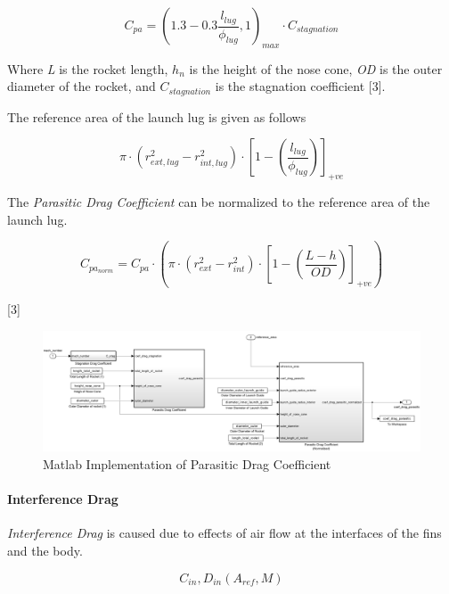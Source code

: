 \documentclass[]{article}
\let\oldparagraph\paragraph
\renewcommand{\paragraph}[1]{\oldparagraph{#1}\mbox{}}
\begin{document}
\begin{equation}
C_{pa} = \left( 1.3 - 0.3 \dfrac{l_{lug}}{\phi_{lug}} , 1 \right)_{max} \cdot C_{stagnation} 
\end{equation}

Where \emph{L} is the rocket length, \(h_n\) is the height of the nose
cone, \emph{OD} is the outer diameter of the rocket, and
\(C_{stagnation}\) is the stagnation coefficient {[}3{]}.

The reference area of the launch lug is given as follows

\begin{equation}
\label{eq_area_reference_launch_lug}
\pi \cdot (r_{ext,lug}^2 - r_{int,lug}^2) \cdot 
\left[ 1 - \left( \dfrac{l_{lug}}{\phi_{lug}} \right) \right]_{+ve} 
\end{equation}

The \emph{Parasitic Drag Coefficient} can be normalized to the reference
area of the launch lug.

\begin{equation}
\label{eq_coef_drag_parasitic_normalized}
C_{pa_{norm}} = 
C_{pa} \cdot 
\left( 
\pi \cdot (r_{ext}^2 - r_{int}^2) \cdot 
\left[ 1 - \left( \dfrac{L-h}{OD} \right)  \right]_{+ve} 
\right) 
\end{equation}

{[}3{]}

\begin{figure}[htbp]
\centering
\includegraphics{images/drag/coef_drag_parasitic.png}
\caption{Matlab Implementation of Parasitic Drag
Coefficient\label{img_coef_drag_parasitic_label}}
\end{figure}

\paragraph{Interference Drag}\label{interference-drag}

\emph{Interference Drag} is caused due to effects of air flow at the
interfaces of the fins and the body.

\begin{equation} 
C_{in}, D_{in} (A_{ref}, M) 
\end{equation}
\end{document}
